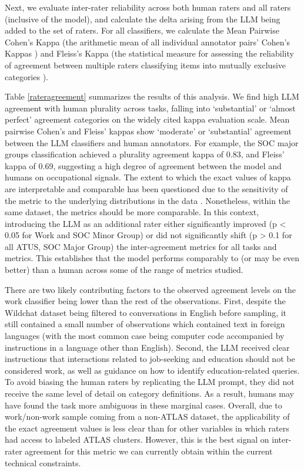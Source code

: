 \documentclass[11pt,a4paper]{article}
\begin{document}
Next, we evaluate inter-rater reliability across both human raters and all raters (inclusive of the model), and calculate the delta arising from the LLM being added to the set of raters. For all classifiers, we calculate the Mean Pairwise Cohen's Kappa (the arithmetic mean of all individual annotator pairs' Cohen's Kappas \citep{Light1971}) and  Fleiss's Kappa (the statistical measure for assessing the reliability of agreement between multiple raters classifying items into mutually exclusive categories \citep{Fleiss1971}).

Table \ref{rateragreement} summarizes the results of this analysis. We find high LLM agreement with human plurality across tasks, falling into ‘substantial’ or ‘almost perfect’ agreement categories on the widely cited \citep{Landis1977} kappa evaluation scale. Mean pairwise Cohen’s and Fleiss’ kappas show ‘moderate’ or ‘substantial’ agreement between the LLM classifiers and human annotators. For example, the SOC major groups classification achieved a plurality agreement kappa of 0.83, and Fleiss’ kappa of 0.69, suggesting a high degree of agreement between the model and humans on occupational signals. The extent to which the exact values of kappa are interpretable and comparable has been questioned due to the sensitivity of the metric to the underlying distributions in the data \citep{Sim2005, Warrens2010}. Nonetheless, within the same dataset, the metrics should be  more comparable. In this context, introducing the LLM as an additional rater either significantly improved (p < 0.05 for Work and SOC Minor Group) or did not significantly shift (p > 0.1 for all ATUS, SOC Major Group) the inter-agreement metrics for all tasks and metrics. This establishes that  the model performs comparably to  (or may be even better) than a human across some of the range of metrics studied. 

There are two likely contributing factors to the observed agreement levels on the work classifier being lower than the rest of the observations. First, despite the Wildchat dataset being filtered to conversations in English before sampling, it still contained a small number of observations which contained text in foreign languages (with the most common case being computer code accompanied by instructions in a language other than English). Second, the LLM received clear instructions that interactions related to job-seeking and education should not be considered work, as well as guidance on how to identify education-related queries. To avoid biasing the human raters by replicating the LLM prompt, they did not receive the same level of detail on category definitions. As a result, humans may have found the task more ambiguous in these marginal cases. Overall, due to work/non-work sample coming from a non-ATLAS dataset, the applicability of the exact agreement values is less clear than for other variables in which raters had access to labeled ATLAS clusters. However, this is the best signal on inter-rater agreement for this metric we can currently obtain within the current technical constraints.    
\end{document}
